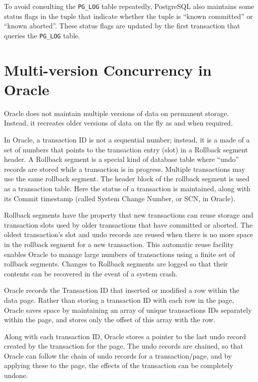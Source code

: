 \documentclass{article}
\begin{document}
To avoid consulting the \verb|PG_LOG| table repeatedly, PostgreSQL
also maintains some status flags in the tuple that indicate whether
the tuple is ``known committed'' or ``known aborted''. These status
flags are updated by the first transaction that queries the
\verb|PG_LOG| table.

\section{Multi-version Concurrency in Oracle}

Oracle does not maintain multiple versions of data on permanent
storage. Instead, it recreates older versions of data on the fly as
and when required.

In Oracle, a transaction ID is not a sequential number; instead, it
is a made of a set of numbers that points to the transaction entry
(slot) in a Rollback segment header. A Rollback segment is a special
kind of database table where ``undo'' records are stored while a
transaction is in progress. Multiple transactions may use the same
rollback segment. The header block of the rollback segment is used
as a transaction table. Here the status of a transaction is
maintained, along with its Commit timestamp (called System Change
Number, or SCN, in Oracle).

Rollback segments have the property that new transactions can reuse
storage and transaction slots used by older transactions that have
committed or aborted. The oldest transaction's slot and undo records
are reused when there is no more space in the rollback segment for a
new transaction. This automatic reuse facility enables Oracle to
manage large numbers of transactions using a finite set of rollback
segments. Changes to Rollback segments are logged so that their
contents can be recovered in the event of a system crash.

Oracle records the Transaction ID that inserted or modified a row
within the data page. Rather than storing a transaction ID with each
row in the page, Oracle saves space by maintaining an array of
unique transactions IDs separately within the page, and stores only
the offset of this array with the row.

Along with each transaction ID, Oracle stores a pointer to the last
undo record created by the transaction for the page. The undo
records are chained, so that Oracle can follow the chain of undo
records for a transaction/page, and by applying these to the page,
the effects of the transaction can be completely undone.
\end{document}

